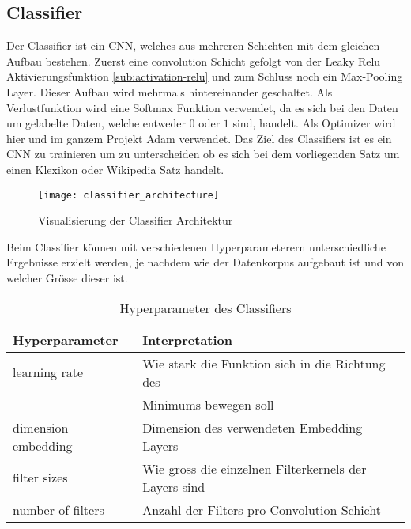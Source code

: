 \subsection{Classifier}
\label{sub:classifier}
Der Classifier ist ein \gls{CNN}, welches aus mehreren Schichten mit dem gleichen Aufbau bestehen. Zuerst eine
convolution Schicht gefolgt von der Leaky Relu Aktivierungsfunktion \ref{sub:activation-relu} und zum Schluss noch ein
Max-Pooling Layer. Dieser Aufbau wird mehrmals hintereinander geschaltet. Als Verlustfunktion wird eine Softmax Funktion
verwendet, da es sich bei den Daten um gelabelte Daten, welche entweder $0$ oder $1$ sind, handelt. Als Optimizer wird
hier und im ganzem Projekt Adam verwendet. Das Ziel des Classifiers ist es ein \gls{CNN} zu trainieren um zu
unterscheiden ob es sich bei dem vorliegenden Satz um einen Klexikon oder Wikipedia Satz handelt.
\begin{figure}[H]
	\centering
	\texttt{[image: classifier\_architecture]}
	\caption{Visualisierung der Classifier Architektur}
	\label{fig:classifier_architecture}
\end{figure}
\noindent
Beim Classifier können mit verschiedenen Hyperparameterern unterschiedliche Ergebnisse erzielt werden, je nachdem wie
der Datenkorpus aufgebaut ist und von welcher Grösse dieser ist.
\begin{table}[ht]
	\centering
	\begin{tabular}{| l | l |}
	\hline
	\textbf{Hyperparameter} & \textbf{Interpretation}                                     \\ \hline
	learning rate           & Wie stark die Funktion sich in die Richtung des             \\ 
	                        & Minimums bewegen soll                                       \\ \hline
	dimension embedding     & Dimension des verwendeten Embedding Layers                  \\ \hline
	filter sizes            & Wie gross die einzelnen Filterkernels der Layers sind       \\ \hline
	number of filters       & Anzahl der Filters pro Convolution Schicht                  \\ \hline                     
	\end{tabular}
	\caption{Hyperparameter des Classifiers}
	\label{tab:Hyperparameter_classifier}
\end{table}

